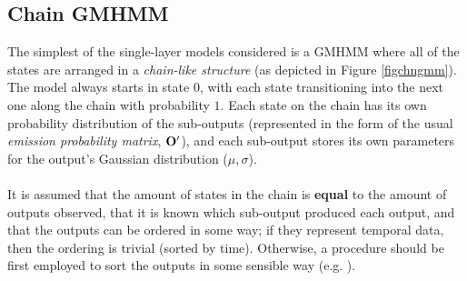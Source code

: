 \documentclass[12pt,a4paper,twoside,openright]{report}
\begin{document}
\subsection{Chain GMHMM}\label{seccgmhmm}

The simplest of the single-layer models considered is a GMHMM where all of the states are arranged in a \emph{chain-like structure} (as depicted in Figure \ref{figchngmm}). The model always starts in state $0$, with each state transitioning into the next one along the chain with probability $1$. Each state on the chain has its own probability distribution of the sub-outputs (represented in the form of the usual \emph{emission probability matrix}, ${\bf O'}$), and each sub-output stores its own parameters for the output's Gaussian distribution ($\mu, \sigma$).\\ \\
It is assumed that the amount of states in the chain is \textbf{equal} to the amount of outputs observed, that it is known which sub-output produced each output, and that the outputs can be ordered in some way; if they represent temporal data, then the ordering is trivial (sorted by time). Otherwise, a procedure should be first employed to sort the outputs in some sensible way (e.g. \cite{mouret2009classification}).
\end{document}

